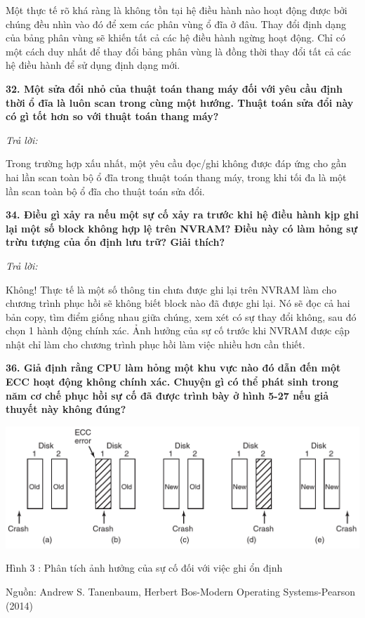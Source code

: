 \documentclass{report}
\begin{document}
\smallskip
Một thực tế rõ khá ràng là không tồn tại hệ điều hành nào hoạt động được bởi chúng đều nhìn vào đó để xem các phân vùng ổ đĩa ở đâu. Thay đổi định dạng của bảng phân vùng sẽ khiến tất cả các hệ điều hành ngừng hoạt động. Chỉ có một cách duy nhất để thay đổi bảng phân vùng là đồng thời thay đổi tất cả các hệ điều hành để sử dụng định dạng mới.

\bigskip
\textbf{32. Một sửa đổi nhỏ của thuật toán thang máy đối với yêu cầu định thời ổ đĩa là luôn scan trong cùng một hướng. Thuật toán sửa đổi này có gì tốt hơn so với thuật toán thang máy?}

\bigskip
\textit{Trả lời:}

\smallskip
Trong trường hợp xấu nhất, một yêu cầu đọc/ghi không được đáp ứng cho gần hai lần scan toàn bộ ổ đĩa trong thuật toán thang máy, trong khi tối đa là một lần scan toàn bộ ổ đĩa cho thuật toán sửa đổi.

\bigskip
\textbf{34. Điều gì xảy ra nếu một sự cố xảy ra trước khi hệ điều hành kịp ghi lại một số block không hợp lệ trên NVRAM? Điều này có làm hỏng sự trừu tượng của ổn định lưu trữ? Giải thích?}

\bigskip
\textit{Trả lời:}

\smallskip
Không! Thực tế là một số thông tin chưa được ghi lại trên NVRAM làm cho chương trình phục hồi sẽ không biết block nào đã được ghi lại. Nó sẽ đọc cả hai bản copy, tìm điểm giống nhau giữa chúng, xem xét có sự thay đổi không, sau đó chọn 1 hành động chính xác. Ảnh hưởng của sự cố trước khi NVRAM được cập nhật chỉ làm cho chương trình phục hồi làm việc nhiều hơn cần thiết.

\bigskip
\textbf{36. Giả định rằng CPU làm hỏng một khu vực nào đó dẫn đến một ECC hoạt động không chính xác. Chuyện gì có thể phát sinh trong năm cơ chế phục hồi sự cố đã được trình bày ở hình 5-27 nếu giả thuyết này không đúng?}

\begin{center}
     \includegraphics[scale=0.6]{hinh3}
\end{center}
\centerline{Hình 3 : Phân tích ảnh hưởng của sự cố đối với việc ghi ổn định}
\changefontsizes{12pt}
\centerline{Nguồn: Andrew S. Tanenbaum, Herbert Bos-Modern Operating Systems-Pearson (2014)}
\changefontsizes{13pt}
\end{document}
